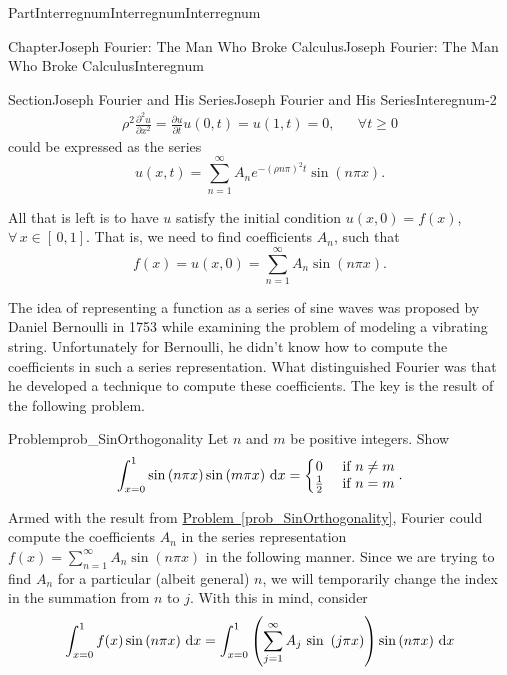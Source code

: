 \documentclass[oneside,10pt,]{book}
\newcommand{\xreffont}{\relax}
\numberwithin{equation}{part}
\newcommand{\dx}[1]{\,{\rm d}#1}
\newcommand{\amp}{&}
\begin{document}
\begin{partptx}{Part}{Interregnum}{}{Interregnum}{}{}{Interregnum}
\begin{chapterptx}{Chapter}{Joseph Fourier: The Man Who Broke Calculus}{}{Joseph Fourier: The Man Who Broke Calculus}{}{}{Interegnum}
\begin{sectionptx}{Section}{Joseph Fourier and His Series}{}{Joseph Fourier and His Series}{}{}{Interegnum-2}
\begin{align*}
\rho^2\frac{\partial^2u}{\partial x^2}=\frac{\partial u}{\partial t} u(0,t)=u(1,t)=0,\amp{}\amp{}\forall t\geq 0
\end{align*}
could be expressed as the series%
\begin{equation*}
u(x,t)=\sum_{n=1}^\infty A_ne^{-(\rho n\pi)^2t}\sin\left(n\pi x\right)\text{.}
\end{equation*}
%
\par
All that is left is to have \(u\) satisfy the initial condition \(u(x,0)=f(x)\), \(\forall\,x\in[\,0,1]\). That is, we need to find coefficients \(A_n\), such that%
\begin{equation*}
f(x)=u(x,0)=\sum_{n=1}^\infty A_n\sin\left(n\pi x\right)\text{.}
\end{equation*}
%
\par
The idea of representing a function as a series of sine waves was proposed by Daniel Bernoulli in 1753 while examining the problem of modeling a vibrating string. Unfortunately for Bernoulli, he didn't know how to compute the coefficients in such a series representation. What distinguished Fourier was that he developed a technique to compute these coefficients. The key is the result of the following problem.%
\begin{problem}{Problem}{}{prob_SinOrthogonality}%
 Let \(n\) and \(m\) be positive integers. Show%
\begin{equation*}
\int_{x=0}^1\sin\left(n\pi x\right)\sin\left(m\pi x\right)\dx{ x}= \left\{\begin{matrix}0\amp \text{ if } n\neq m\\ \frac{1}{2}\amp \text{ if } n=m \end{matrix} \right.. {}
\end{equation*}
%
\end{problem}
Armed with the result from \hyperref[prob_SinOrthogonality]{Problem~{\xreffont\ref{prob_SinOrthogonality}}},  Fourier could compute the coefficients \(A_n\) in the series representation \(f(x)=\sum_{n=1}^\infty A_n \sin\left(n\pi x\right)\) in the following manner. Since we are trying to find \(A_n\) for a particular (albeit general) \(n\), we will temporarily change the index in the summation from \(n\) to \(j\). With this in mind, consider%
\begin{align*}
\int_{x=0}^1f(x)\sin\left(n\pi x\right)\dx{ x} \amp =\int_{x=0}^1\left(\sum_{j=1}^\infty A_j\text{ sin } \left(j\pi x\right)\right)\sin\left(n\pi x\right)\dx{ x}\\

\end{align*}
\end{sectionptx}
\end{chapterptx}
\end{partptx}
\end{document}
